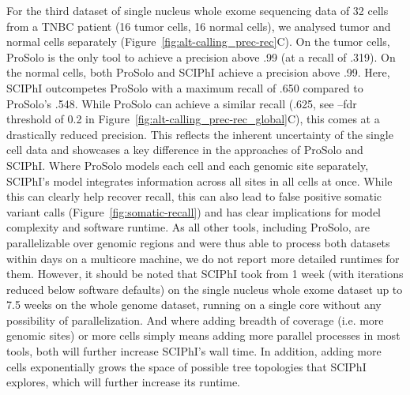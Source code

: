 \documentclass[12pt,inline]{wlscirep}
\begin{document}
For the third dataset of single nucleus whole exome sequencing data of 32 cells from a TNBC patient (16 tumor cells, 16 normal cells), we analysed tumor and normal cells separately (Figure~\ref{fig:alt-calling_prec-rec}C).
On the tumor cells, ProSolo is the only tool to achieve a precision above .99 (at a recall of .319).
On the normal cells, both ProSolo and SCIPhI achieve a precision above .99.
Here, SCIPhI outcompetes ProSolo with a maximum recall of .650 compared to ProSolo's .548.
While ProSolo can achieve a similar recall (.625, see {\ttfamily --fdr} threshold of 0.2 in Figure~\ref{fig:alt-calling_prec-rec_global}C), this comes at a drastically reduced precision.
This reflects the inherent uncertainty of the single cell data and showcases a key difference in the approaches of ProSolo and SCIPhI.
Where ProSolo models each cell and each genomic site separately, SCIPhI's model integrates information across all sites in all cells at once.
While this can clearly help recover recall, this can also lead to false positive somatic variant calls (Figure~\ref{fig:somatic-recall}) and has clear implications for model complexity and software runtime.
As all other tools, including ProSolo, are parallelizable over genomic regions and were thus able to process both datasets within days on a multicore machine, we do not report more detailed runtimes for them.
However, it should be noted that SCIPhI took from 1 week (with iterations reduced below software defaults) on the single nucleus whole exome dataset up to 7.5 weeks on the whole genome dataset, running on a single core without any possibility of parallelization.
And where adding breadth of coverage (i.e. more genomic sites) or more cells simply means adding more parallel processes in most tools, both will further increase SCIPhI's wall time.
In addition, adding more cells exponentially grows the space of possible tree topologies that SCIPhI explores\cite{lahnemann_eleven_2020}, which will further increase its runtime.
\end{document}
